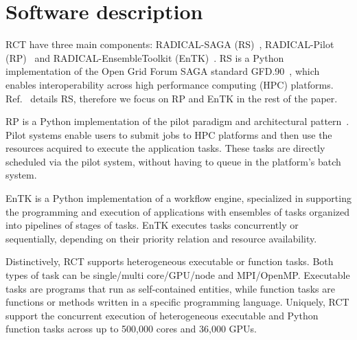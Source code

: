 \documentclass[preprint,12pt, a4paper]{elsarticle}
\begin{document}
\section{Software description}\label{sec:description}



RCT have three main components: RADICAL-SAGA (RS)~\cite{merzky2015saga},
RADICAL-Pilot (RP)~\cite{merzky2018using} and RADICAL-EnsembleToolkit
(EnTK)~\cite{balasubramanian2016ensemble,balasubramanian2018harnessing}.
RS is a Python implementation of the Open Grid Forum SAGA standard
GFD.90~\cite{goodale2006saga},
which enables interoperability across high performance computing (HPC)
platforms.
Ref.~\cite{merzky2015saga} details RS, therefore we focus on RP and EnTK in the
rest of the paper.

RP is a Python implementation of the pilot paradigm and architectural
pattern~\cite{turilli2018comprehensive}. Pilot systems enable users to submit
jobs to HPC platforms and then use the resources acquired to execute the
application tasks. These tasks are directly scheduled via the pilot system,
without having to queue in the platform's batch system.

EnTK is a Python implementation of a workflow engine, specialized in supporting
the programming and execution of applications with ensembles of tasks organized
into pipelines of stages of tasks. EnTK executes tasks concurrently or
sequentially, depending on their priority relation and resource availability.

Distinctively, RCT supports heterogeneous executable or function tasks. Both
types of task can be single/multi core/GPU/node and MPI/OpenMP\@. Executable
tasks are programs that run as self-contained entities, while function tasks are
functions or methods written in a specific programming language. Uniquely, RCT
support the concurrent execution of heterogeneous executable and Python function
tasks across up to 500,000 cores and 36,000 GPUs.
\end{document}
